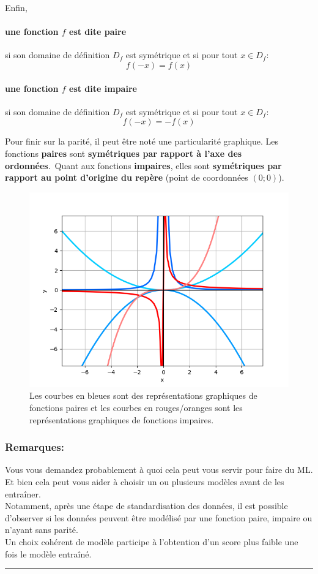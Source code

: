 \documentclass[11pt, french]{article}
\begin{document}
Enfin,\
\paragraph{une fonction $f$ est dite paire} si son domaine de définition $D_f$ est symétrique et si pour tout $x\in D_f$:
\begin{equation*}
    f(-x) = f(x)
\end{equation*}
\paragraph{une fonction $f$ est dite impaire} si son domaine de définition $D_f$ est symétrique et si pour tout $x\in D_f$:
\begin{equation*}
f(-x) = - f(x)
\end{equation*}

Pour finir sur la parité, il peut être noté une particularité graphique.
Les fonctions \textbf{paires} sont \textbf{symétriques par rapport à l'axe des ordonnées}.\
Quant aux fonctions \textbf{impaires}, elles sont \textbf{symétriques par rapport au point d'origine du repère} (point de coordonnées $(0; 0)$).

\begin{figure}[!h]
\center
\includegraphics[scale=0.6]{assets/serie_2_exo_2_figure_1.png}
\caption{Les courbes en bleues sont des représentations graphiques de fonctions paires et les courbes en rouges/oranges sont les représentations graphiques de fonctions impaires.}
\label{fig:p_s_2_exo1-fig1}
\end{figure}

\subsubsection*{Remarques:}
Vous vous demandez probablement à quoi cela peut vous servir pour faire du ML. Et bien cela peut vous aider à choisir un ou plusieurs modèles avant de les entraîner.\\
Notamment, après une étape de standardisation des données, il est possible d'observer si les données peuvent être modélisé par une fonction paire, impaire ou n'ayant sans parité.\\
Un choix cohérent de modèle participe à l'obtention d'un score plus faible une fois le modèle entraîné.
\noindent\rule{\textwidth}{1pt}
\end{document}
